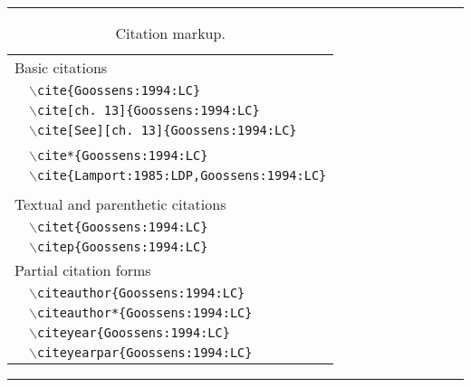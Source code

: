 \documentclass[twoside]{article}
\newcommand{\BS}{$\backslash$}
\newenvironment{Table}[1]{%
   \begin{table}[htb]\hrule\begin{centering}\caption{#1}}{%
   \par\end{centering}\hrule\end{table}}
\newenvironment{Tabular}[1]{%
   \begingroup\def\arraystretch{1.3}\small \begin{tabular}{#1}}{%
   \end{tabular}\endgroup}
\begin{document}
\begin{Table}{Citation markup.\label{tab:citemarkup}}
\begin{Tabular}{lll}
\multicolumn{3}{l}{Basic citations}\\
 & \texttt{\BS cite\{Goossens:1994:LC\}} &\cite{Goossens:1994:LC}\\
 & \texttt{\BS cite[ch.~13]\{Goossens:1994:LC\}} &\cite[ch.~13]{Goossens:1994:LC}\\
 & \multicolumn{2}{l}{\texttt{\BS cite[See][ch.~13]\{Goossens:1994:LC\}}} \\
      &&\cite[See][ch.~13]{Goossens:1994:LC}\\
 & \texttt{\BS cite*\{Goossens:1994:LC\}} &\cite*{Goossens:1994:LC}\\
 &\multicolumn{2}{l}{\texttt{\BS cite\{Lamport:1985:LDP,Goossens:1994:LC\}}}\\
     &&\citet{Lamport:1985:LDP,Goossens:1994:LC}\\
\multicolumn{3}{l}{Textual and parenthetic citations}\\
 & \texttt{\BS citet\{Goossens:1994:LC\}} &\citet{Goossens:1994:LC}\\
 & \texttt{\BS citep\{Goossens:1994:LC\}} &\citep{Goossens:1994:LC}\\
\multicolumn{3}{l}{Partial citation forms}\\
 & \texttt{\BS citeauthor\{Goossens:1994:LC\}} &\citeauthor{Goossens:1994:LC}\\
 & \texttt{\BS citeauthor*\{Goossens:1994:LC\}} &\citeauthor*{Goossens:1994:LC}\\
 & \texttt{\BS citeyear\{Goossens:1994:LC\}} &\citeyear{Goossens:1994:LC}\\
 & \texttt{\BS citeyearpar\{Goossens:1994:LC\}} &\citeyearpar{Goossens:1994:LC}\\
\end{Tabular}
\end{Table}
\end{document}
